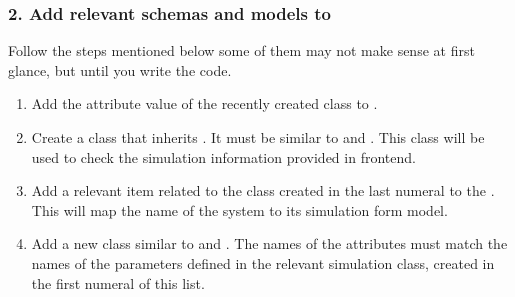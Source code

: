 \documentclass[a4paper,landscape,10pt,english]{sphinxmanual}
\begin{document}
\subsubsection{2. Add relevant schemas and models to }
\label{\detokenize{code_docs/new_simulation:add-relevant-schemas-and-models-to-schemas}}\label{\detokenize{code_docs/new_simulation:new-simulation-schemas}}
Follow the steps mentioned below \textendash{}some of them may not make sense at first
glance, but until you write the code.
\begin{enumerate}
%
\item {} 
Add the {\hyperref[\detokenize{code_docs/simulation_API.simulation:simulation_API.simulation.simulations.Simulation.system}]{}}
attribute value of the recently created class to
{\hyperref[\detokenize{code_docs/simulation_API.controller:simulation_API.controller.schemas.SimSystem}]{}}.

\item {} 
Create a class that inherits {\hyperref[\detokenize{code_docs/simulation_API.controller:simulation_API.controller.schemas.SimForm}]{}}.
It must be similar to {\hyperref[\detokenize{code_docs/simulation_API.controller:simulation_API.controller.schemas.HOSimForm}]{}}
and {\hyperref[\detokenize{code_docs/simulation_API.controller:simulation_API.controller.schemas.ChenLeeSimForm}]{}}. This class
will be used to check the simulation information provided in frontend.

\item {} 
Add a relevant item \textendash{}related to the class created in the last numeral\textendash{} to the
 {\hyperref[\detokenize{code_docs/simulation_API.controller:simulation_API.controller.schemas.SimFormDict}]{}}. This will
map the name of the system to its simulation form model.

\item {} 
Add a new class similar to {\hyperref[\detokenize{code_docs/simulation_API.controller:simulation_API.controller.schemas.HOParams}]{}}
and {\hyperref[\detokenize{code_docs/simulation_API.controller:simulation_API.controller.schemas.ChenLeeParams}]{}}. The names
of the attributes must match the names of the parameters defined in the
relevant simulation class, created in the first numeral of this list.


\end{enumerate}
\end{document}
